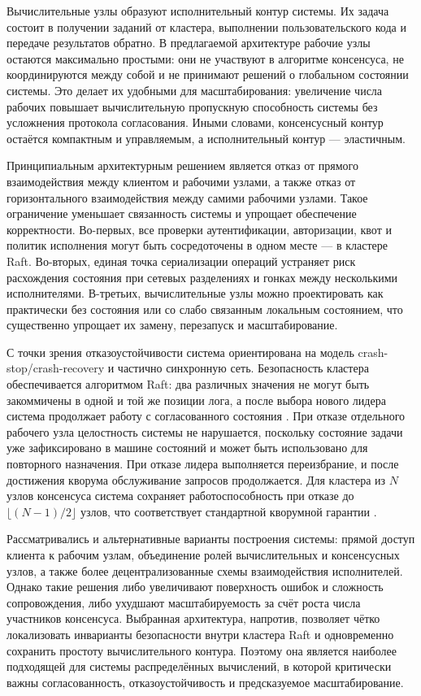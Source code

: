 Вычислительные узлы образуют исполнительный контур системы. Их задача состоит в
получении заданий от кластера, выполнении пользовательского кода и передаче
результатов обратно. В предлагаемой архитектуре рабочие узлы остаются
максимально простыми: они не участвуют в алгоритме консенсуса, не
координируются между собой и не принимают решений о глобальном состоянии
системы. Это делает их удобными для масштабирования: увеличение числа рабочих
повышает вычислительную пропускную способность системы без усложнения протокола
согласования. Иными словами, консенсусный контур остаётся компактным и
управляемым, а исполнительный контур --- эластичным.

Принципиальным архитектурным решением является отказ от прямого взаимодействия
между клиентом и рабочими узлами, а также отказ от горизонтального взаимодействия
между самими рабочими узлами. Такое ограничение уменьшает связанность системы и
упрощает обеспечение корректности. Во-первых, все проверки аутентификации,
авторизации, квот и политик исполнения могут быть сосредоточены в одном месте
--- в кластере Raft. Во-вторых, единая точка сериализации операций устраняет
риск расхождения состояния при сетевых разделениях и гонках между несколькими
исполнителями. В-третьих, вычислительные узлы можно проектировать как
практически без состояния или со слабо связанным локальным состоянием, что
существенно упрощает их замену, перезапуск и масштабирование.

С точки зрения отказоустойчивости система ориентирована на модель
crash-stop/crash-recovery и частично синхронную сеть. Безопасность кластера
обеспечивается алгоритмом Raft: два различных значения не могут быть
закоммичены в одной и той же позиции лога, а после выбора нового лидера
система продолжает работу с согласованного состояния \cite{ongario2014}. При
отказе отдельного рабочего узла целостность системы не нарушается, поскольку
состояние задачи уже зафиксировано в машине состояний и может быть использовано
для повторного назначения. При отказе лидера выполняется переизбрание, и после
достижения кворума обслуживание запросов продолжается. Для кластера из $N$
узлов консенсуса система сохраняет работоспособность при отказе до
$\lfloor (N-1)/2 \rfloor$ узлов, что соответствует стандартной кворумной
гарантии \cite{lynch1996}.

Рассматривались и альтернативные варианты построения системы: прямой доступ
клиента к рабочим узлам, объединение ролей вычислительных и консенсусных узлов,
а также более децентрализованные схемы взаимодействия исполнителей. Однако
такие решения либо увеличивают поверхность ошибок и сложность сопровождения,
либо ухудшают масштабируемость за счёт роста числа участников консенсуса.
Выбранная архитектура, напротив, позволяет чётко локализовать инварианты
безопасности внутри кластера Raft и одновременно сохранить простоту
вычислительного контура. Поэтому она является наиболее подходящей для системы
распределённых вычислений, в которой критически важны согласованность,
отказоустойчивость и предсказуемое масштабирование.
